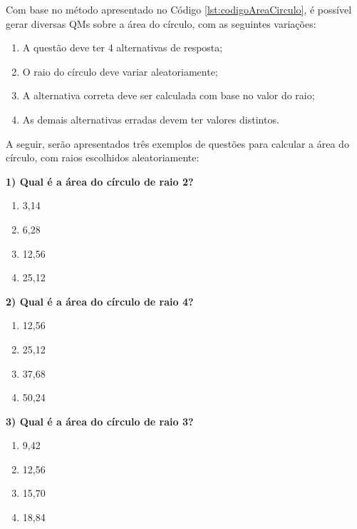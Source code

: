 Com base no método apresentado no Código \ref{lst:codigoAreaCirculo}, é possível gerar diversas QMs sobre a área do círculo, com as seguintes variações:

\begin{enumerate}
\item A questão deve ter 4 alternativas de resposta;
\item O raio do círculo deve variar aleatoriamente;
\item A alternativa correta deve ser calculada com base no valor do raio;
\item As demais alternativas erradas devem ter valores distintos.
\end{enumerate}

A seguir, serão apresentados três exemplos de questões para calcular a área do círculo, com raios escolhidos aleatoriamente:

\begin{description}
    
    \item \textbf{1) Qual é a área do círculo de raio 2?}

\begin{multicols}{4}
\begin{enumerate}[label=\Alph*.]
\item 3,14
\item 6,28
\item 12,56
\item 25,12
\end{enumerate}
\end{multicols}

    \item \textbf{2) Qual é a área do círculo de raio 4?}

\begin{multicols}{4}
\begin{enumerate}[label=\Alph*.]
\itemsep0pt\parskip0pt
\item 12,56
\item 25,12
\item 37,68
\item 50,24
\end{enumerate}\normalsize
\end{multicols}

    \item \textbf{3) Qual é a área do círculo de raio 3?}

\begin{multicols}{4}
\begin{enumerate}[label=\Alph*.]
\itemsep0pt\parskip0pt
\item 9,42
\item 12,56
\item 15,70
\item 18,84
\end{enumerate}\normalsize
\end{multicols}

\end{description}


